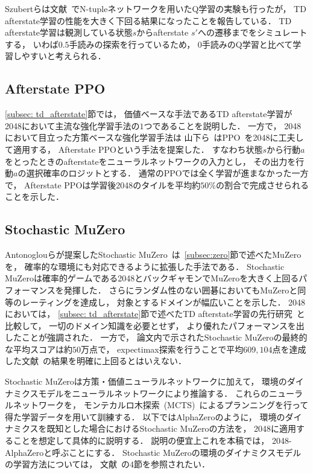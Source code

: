 Szubertらは文献~\cite{Szubert}でN-tupleネットワークを用いたQ学習の実験も行ったが， TD afterstate学習の性能を大きく下回る結果になったことを報告している．
TD afterstate学習は観測している状態$s$からafterstate $s'$への遷移までをシミュレートする， いわば$0.5$手読みの探索を行っているため， $0$手読みのQ学習と比べて学習しやすいと考えられる．

\subsection{Afterstate PPO}
\ref{subsec: td_afterstate}節では， 価値ベースな手法であるTD afterstate学習が2048において主流な強化学習手法の$1$つであることを説明した．
一方で， 2048において目立った方策ベースな強化学習手法は
山下ら~\cite{afterstate_ppo}はPPO~\cite{PPO}を2048に工夫して適用する， Afterstate PPOという手法を提案した．
すなわち状態$s$から行動$a$をとったときのafterstateをニューラルネットワークの入力とし， その出力を行動$a$の選択確率のロジットとする．
通常のPPOでは全く学習が進まなかった一方で， Afterstate PPOは学習後2048のタイルを平均約$50\%$の割合で完成させられることを示した．

\subsection{Stochastic MuZero}
\label{subsec: stochastic_muzero}
Antonoglouらが提案したStochastic MuZero~\cite{StochasticMuZero}は~\ref{subsec:zero}節で述べたMuZeroを， 確率的な環境にも対応できるように拡張した手法である．
Stochastic MuZeroは確率的ゲームである2048とバックギャモンでMuZeroを大きく上回るパフォーマンスを発揮した．
さらにランダム性のない囲碁においてもMuZeroと同等のレーティングを達成し， 対象とするドメインが幅広いことを示した．
2048においては， \ref{subsec: td_afterstate}節で述べたTD afterstate学習の先行研究~\cite{DBLP:journals/corr/Jaskowski16}と比較して， 一切のドメイン知識を必要とせず， より優れたパフォーマンスを出したことが強調された．
一方で， 論文内で示されたStochastic MuZeroの最終的な平均スコアは約$50$万点で， expectimax探索を行うことで平均$609,104$点を達成した文献~\cite{DBLP:journals/corr/Jaskowski16}の結果を明確に上回るとはいえない．

Stochastic MuZeroは方策・価値ニューラルネットワークに加えて， 環境のダイナミクスモデルをニューラルネットワークにより推論する．
これらのニューラルネットワークを， モンテカルロ木探索~(MCTS)~によるプランニングを行って得た学習データを用いて訓練する．
以下ではAlphaZeroのように， 環境のダイナミクスを既知とした場合におけるStochastic MuZeroの方法を， 2048に適用することを想定して具体的に説明する．
説明の便宜上これを本稿では， 2048-AlphaZeroと呼ぶことにする．
Stochastic MuZeroの環境のダイナミクスモデルの学習方法については， 文献~\cite{StochasticMuZero}の$4$節を参照されたい．

